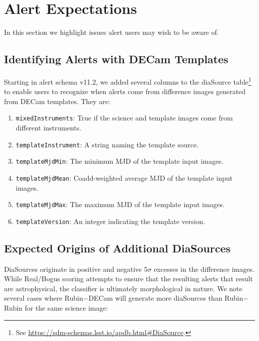 \section{Alert Expectations} \label{sec:alerts}


In this section we highlight issues alert users may wish to be aware of.


\subsection{Identifying Alerts with DECam Templates}

Starting in alert schema v11.2, we added several columns to the diaSource table\footnote{See \url{https://sdm-schemas.lsst.io/apdb.html\#DiaSource}.} to enable users to recognize when alerts come from difference images generated from DECam templates. 
They are:

\begin{enumerate}
\item \texttt{mixedInstruments}: True if the science and template images come from different instruments.
\item \texttt{templateInstrument}: A string naming the template source.
\item \texttt{templateMjdMin}: The minimum MJD of the template input images.
\item \texttt{templateMjdMean}: Coadd-weighted average MJD of the template input images.
\item \texttt{templateMjdMax}: The maximum MJD of the template input images.
\item \texttt{templateVersion}: An integer indicating the template version.
\end{enumerate}


\subsection{Expected Origins of Additional DiaSources}

DiaSources originate in positive and negative $5\sigma$ excesses in the difference images.
While Real/Bogus scoring \citep{DMTN-337} attempts to ensure that the resulting alerts that result are astrophysical, the classifier is ultimately morphological in nature.  
We note several cases where Rubin$-$DECam will generate more diaSources than Rubin$-$Rubin for the same science image:

